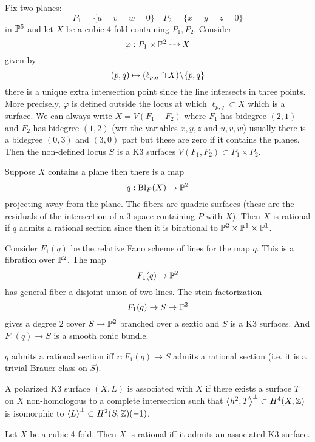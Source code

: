 \documentclass[12pt]{article}
\begin{document}
\begin{example}
Fix two planes:
\[ P_1 = \{ u = v = w = 0 \} \quad P_2 = \{ x = y = z = 0 \} \]
in $\P^5$ and let $X$ be a cubic 4-fold containing $P_1, P_2$. Consider
\[ \varphi : P_1 \times \P^2 \rat X \]
given by
\[ (p, q) \mapsto (\ell_{p,q} \cap X) \sm \{ p, q \} \]
there is a unique extra intersection point since the line intersects in three points. More precisely, $\varphi$ is defined outside the locus at which $\ell_{p,q} \subset X$ which is a surface. We can always write $X = V(F_1 + F_2)$ where $F_1$ has bidegree $(2,1)$ and $F_2$ has bidegree $(1,2)$ (wrt the variables $x,y,z$ and $u,v,w$) usually there is a bidegree $(0,3)$ and $(3,0)$ part but these are zero if it contains the planes. Then the non-defined locus $S$ is a K3 surfaces $V(F_1, F_2) \subset P_1 \times P_2$.
\end{example}

\begin{example}
Suppose $X$ contains a plane then there is a map
\[ q : \Bl_P(X) \to \P^2 \]
projecting away from the plane. The fibers are quadric surfaces (these are the residuals of the intersection of a $3$-space containing $P$ with $X$). Then $X$ is rational if $q$ admits a rational section since then it is birational to $\P^2 \times \P^1 \times \P^1$. 
\end{example}

Consider $F_1(q)$ be the relative Fano scheme of lines for the map $q$. This is a fibration over $\P^2$. The map
\[ F_1(q) \to \P^2 \]
has general fiber a disjoint union of two lines. The stein factorization
\[ F_1(q) \to S \to \P^2 \]
gives a degree $2$ cover $S \to \P^2$ branched over a sextic and $S$ is a K3 surfaces. And $F_1(q) \to S$ is a smooth conic bundle. 

\begin{prop}
$q$ admits a rational section iff $r : F_1(q) \to S$ admits a rational section (i.e. it is a trivial Brauer class on $S$). 
\end{prop} 

\begin{defn}
A polarized K3 surface $(X, L)$ is associated with $X$ if there exists a surface $T$ on $X$ non-homologous to a complete intersection such that $\left< h^2, T \right>^{\perp} \subset H^4(X, \ZZ)$ is isomorphic to $\left< L \right>^\perp \subset H^2(S, \Z)(-1)$.
\end{defn}

\begin{conj}
Let $X$ be a cubic 4-fold. Then $X$ is rational iff it admits an associated K3 surface. 
\end{conj}
\end{document}
